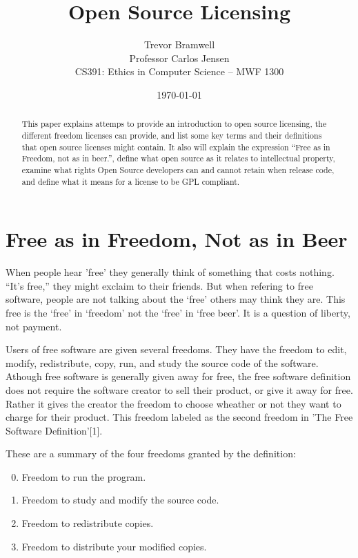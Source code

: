 \documentclass[12pt,letterpaper]{article}
\title{Open Source Licensing}
\author{
    Trevor Bramwell\\
    Professor Carlos Jensen\\
    CS391: Ethics in Computer Science -- MWF 1300\\
}
\date{\today}
\begin{document}
\maketitle

\begin{abstract}
This paper explains attemps to provide an introduction to open source
licensing, the different freedom licenses can provide, and list some key
terms and their definitions that open source licenses might contain.  It
also will explain the expression ``Free as in Freedom, not as in
beer.'', define what open source as it relates to intellectual property,
examine what rights Open Source developers can and cannot retain when
release code, and define what it means for a license to be GPL
compliant.
\end{abstract}


\section{Free as in Freedom, Not as in Beer}
When people hear 'free' they generally think of something that costs
nothing. ``It's free,'' they might exclaim to their friends. But
when refering to free software, people are not talking about the `free'
others may think they are. This free is the `free' in `freedom' not
the `free' in `free beer'. It is a question of liberty, not payment.

Users of free software are given several freedoms. They have the freedom
to edit, modify, redistribute, copy, run, and study the source code of
the software. Athough free software is
generally given away for free, the free software definition does not
require the software creator to sell their product, or give it away for
free. Rather it gives the creator the freedom to choose wheather or not
they want to charge for their product. This freedom labeled as the
second freedom in 'The Free Software Definition'[1].

These are a summary of the four freedoms granted by the definition:
    \begin{enumerate}
    \setcounter{enumi}{-1}
        \item Freedom to run the program.
        \item Freedom to study and modify the source code.
        \item Freedom to redistribute copies.
        \item Freedom to distribute your modified copies.
    \end{enumerate}
\end{document}
